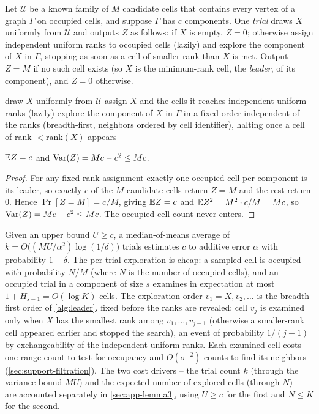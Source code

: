 Let $\mathcal U$ be a known family of $M$ candidate cells that contains every vertex of a graph $\Gamma$
on occupied cells, and suppose $\Gamma$ has $c$ components. One \emph{trial} draws $X$ uniformly from
$\mathcal U$ and outputs $Z$ as follows: if $X$ is empty, $Z=0$; otherwise assign independent uniform
ranks to occupied cells (lazily) and explore the component of $X$ in $\Gamma$, stopping as soon as a cell
of smaller rank than $X$ is met. Output $Z=M$ if no such cell exists (so $X$ is the minimum-rank cell, the
\emph{leader}, of its component), and $Z=0$ otherwise.

\begin{algorithm}[t]
\caption{One trial of the empty-cell leader estimator}\label{alg:leader}
draw $X$ uniformly from $\mathcal U$\;
assign $X$ and the cells it reaches independent uniform ranks (lazily)\;
explore the component of $X$ in $\Gamma$ in a fixed order independent of the ranks (breadth-first, neighbors ordered by cell identifier), halting once a cell of rank $<\mathrm{rank}(X)$ appears\;
\end{algorithm}

\begin{lemma}\label{lem:leader}
$\mathbb{E} Z=c$ and $\operatorname{Var}(Z)=Mc-c^2\le Mc$.
\end{lemma}

\begin{proof}
For any fixed rank assignment exactly one occupied cell per component is its leader, so exactly $c$ of the
$M$ candidate cells return $Z=M$ and the rest return $0$. Hence $\Pr[Z=M]=c/M$, giving $\mathbb{E} Z=c$ and
$\mathbb{E} Z^2=M^2\cdot c/M=Mc$, so $\operatorname{Var}(Z)=Mc-c^2\le Mc$. The occupied-cell count never enters.
\end{proof}

Given an upper bound $U\ge c$, a median-of-means average of $k=O\!\bigl((MU/\alpha^2)\log(1/\delta)\bigr)$
trials estimates $c$ to additive error $\alpha$ with probability $1-\delta$. The per-trial exploration is
cheap: a sampled cell is occupied with probability $N/M$ (where $N$ is the number of occupied cells), and
an occupied trial in a component of size $s$ examines in expectation at most $1+H_{s-1}=O(\log K)$ cells.
The exploration order $v_1=X,v_2,\dots$ is the breadth-first order of \cref{alg:leader}, fixed before the
ranks are revealed; cell $v_j$ is examined only when $X$ has the smallest rank among $v_1,\dots,v_{j-1}$
(otherwise a smaller-rank cell appeared earlier and stopped the search), an event of probability
$1/(j-1)$ by exchangeability of the independent uniform ranks. Each examined cell costs one range count to test for
occupancy and $O(\sigma^{-2})$ counts to find its neighbors (\cref{sec:support-filtration}). The two cost
drivers -- the trial count $k$ (through the variance bound $MU$) and the expected number of explored cells
(through $N$) -- are accounted separately in \cref{sec:app-lemma3}, using $U\ge c$ for the first and
$N\le K$ for the second.

